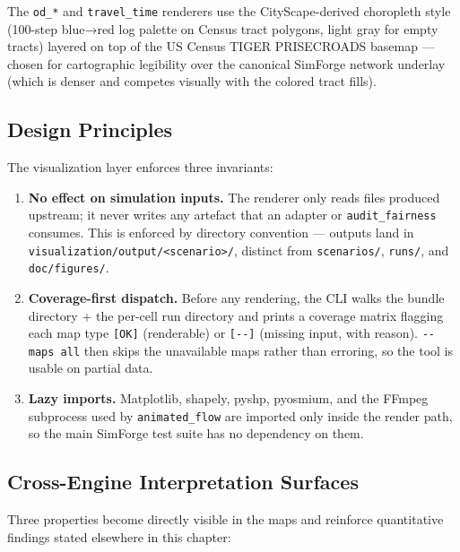 The \texttt{od\_*} and \texttt{travel\_time} renderers use the
CityScape-derived choropleth style (100-step blue→red log palette on
Census tract polygons, light gray for empty tracts) layered on top of
the US Census TIGER PRISECROADS basemap --- chosen for cartographic
legibility over the canonical SimForge network underlay (which is denser
and competes visually with the colored tract fills).

\subsection{Design Principles}\label{392-design-principles}

The visualization layer enforces three invariants:

\begin{enumerate}
\def\labelenumi{\arabic{enumi}.}
\tightlist
\item
  \textbf{No effect on simulation inputs.} The renderer only reads files
  produced upstream; it never writes any artefact that an adapter or
  \texttt{audit\_fairness} consumes. This is enforced by directory
  convention --- outputs land in
  \texttt{visualization/output/\textless{}scenario\textgreater{}/},
  distinct from \texttt{scenarios/}, \texttt{runs/}, and
  \texttt{doc/figures/}.
\item
  \textbf{Coverage-first dispatch.} Before any rendering, the CLI walks
  the bundle directory + the per-cell run directory and prints a
  coverage matrix flagging each map type \texttt{{[}OK{]}} (renderable)
  or \texttt{{[}-\/-{]}} (missing input, with reason).
  \texttt{-\/-maps\ all} then skips the unavailable maps rather than
  erroring, so the tool is usable on partial data.
\item
  \textbf{Lazy imports.} Matplotlib, shapely, pyshp, pyosmium, and the
  FFmpeg subprocess used by \texttt{animated\_flow} are imported only
  inside the render path, so the main SimForge test suite has no
  dependency on them.
\end{enumerate}

\subsection{Cross-Engine Interpretation
Surfaces}\label{393-cross-engine-interpretation-surfaces}

Three properties become directly visible in the maps and reinforce
quantitative findings stated elsewhere in this chapter:

